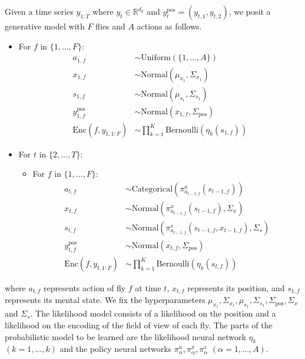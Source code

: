 \documentclass{article}
\begin{document}
Given a time series $y_{1:T}$ where $y_t \in \mathbb R^{d_y}$ and $y_t^{\text{pos}} = (y_{t, 1}, y_{t, 2})$, we posit a generative model with $F$ flies and $A$ actions as follows.
\begin{itemize}
    \item For $f$ in $\{1, \dotsc, F\}$:
    \begin{align}
        a_{1, f} &\sim \mathrm{Uniform}(\{1, \dotsc, A\}) \\
        x_{1, f} &\sim \mathrm{Normal}(\mu_{x_1}, \Sigma_{x_1}) \\
        s_{1, f} &\sim \mathrm{Normal}(\mu_{s_1}, \Sigma_{s_1}) \\
        y_{1, f}^{\text{pos}} &\sim \mathrm{Normal}(x_{1, f}, \Sigma_{\text{pos}}) \\
        \mathrm{Enc}(f, y_{1, 1:F}) &\sim \prod_{k = 1}^K \mathrm{Bernoulli}(\eta_k(s_{1, f}))
    \end{align}
    \item For $t$ in $\{2, \dotsc, T\}$:
    \begin{itemize}
        \item For $f$ in $\{1, \dotsc, F\}$:
        \begin{align}
            a_{t, f} &\sim \mathrm{Categorical}(\pi_{a_{t - 1, f}}^a(s_{t - 1, f})) \\
            x_{t, f} &\sim \mathrm{Normal}(\pi_{a_{t - 1, f}}^x(s_{t - 1, f}), \Sigma_x) \\
            s_{t, f} &\sim \mathrm{Normal}(\pi_{a_{t - 1, f}}^s(s_{t - 1, f}, x_{t - 1, f}), \Sigma_s) \\
            y_{t, f}^{\text{pos}} &\sim \mathrm{Normal}(x_{t, f}, \Sigma_{\text{pos}}) \\
            \mathrm{Enc}(f, y_{t, 1:F}) &\sim \prod_{k = 1}^K \mathrm{Bernoulli}(\eta_k(s_{t, f}))
        \end{align}
    \end{itemize}
\end{itemize}
where $a_{t, f}$ represents action of fly $f$ at time $t$, $x_{t, f}$ represents its position, and $s_{1, f}$ represents its mental state.
We fix the hyperparameters $\mu_{x_1}, \Sigma_{x_1}, \mu_{s_1}, \Sigma_{s_1}, \Sigma_{\text{pos}}, \Sigma_x$ and $\Sigma_s$.
The likelihood model consists of a likelihood on the position and a likelihood on the encoding of the field of view of each fly.
The parts of the probabilistic model to be learned are the likelihood neural network $\eta_k$ $(k = 1, \dotsc, k)$ and the policy neural networks $\pi_\alpha^a, \pi_\alpha^x, \pi_\alpha^s$ $(\alpha = 1, \dotsc, A)$.
\end{document}
